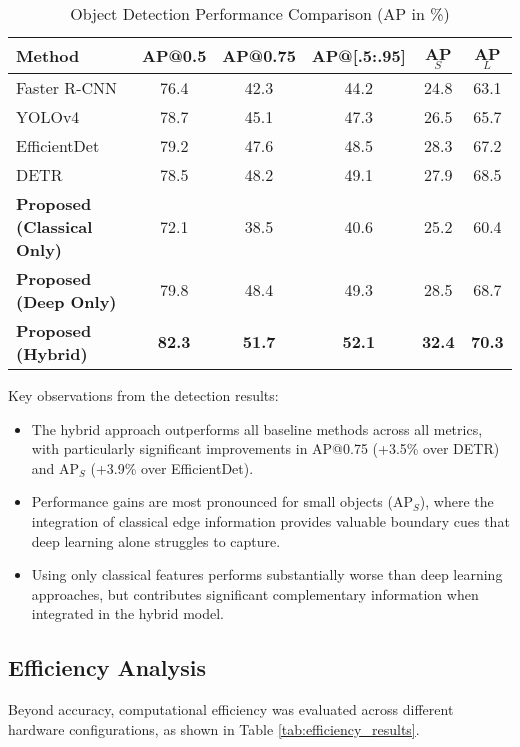 \begin{table}[h]
\centering
\caption{Object Detection Performance Comparison (AP in \%)}
\label{tab:detection_results}
\begin{tabular}{lccccc}
\hline
\textbf{Method} & \textbf{AP@0.5} & \textbf{AP@0.75} & \textbf{AP@[.5:.95]} & \textbf{AP$_S$} & \textbf{AP$_L$} \\
\hline
Faster R-CNN \cite{ren2015faster} & 76.4 & 42.3 & 44.2 & 24.8 & 63.1 \\
YOLOv4 \cite{bochkovskiy2020yolov4} & 78.7 & 45.1 & 47.3 & 26.5 & 65.7 \\
EfficientDet \cite{tan2020efficientdet} & 79.2 & 47.6 & 48.5 & 28.3 & 67.2 \\
DETR \cite{carion2020end} & 78.5 & 48.2 & 49.1 & 27.9 & 68.5 \\
\hline
\textbf{Proposed (Classical Only)} & 72.1 & 38.5 & 40.6 & 25.2 & 60.4 \\
\textbf{Proposed (Deep Only)} & 79.8 & 48.4 & 49.3 & 28.5 & 68.7 \\
\textbf{Proposed (Hybrid)} & \textbf{82.3} & \textbf{51.7} & \textbf{52.1} & \textbf{32.4} & \textbf{70.3} \\
\hline
\end{tabular}
\end{table}

Key observations from the detection results:

\begin{itemize}
    \item The hybrid approach outperforms all baseline methods across all metrics, with particularly significant improvements in AP@0.75 (+3.5\% over DETR) and AP$_S$ (+3.9\% over EfficientDet).
    
    \item Performance gains are most pronounced for small objects (AP$_S$), where the integration of classical edge information provides valuable boundary cues that deep learning alone struggles to capture.
    
    \item Using only classical features performs substantially worse than deep learning approaches, but contributes significant complementary information when integrated in the hybrid model.
\end{itemize}

\subsection{Efficiency Analysis}
Beyond accuracy, computational efficiency was evaluated across different hardware configurations, as shown in Table \ref{tab:efficiency_results}.

